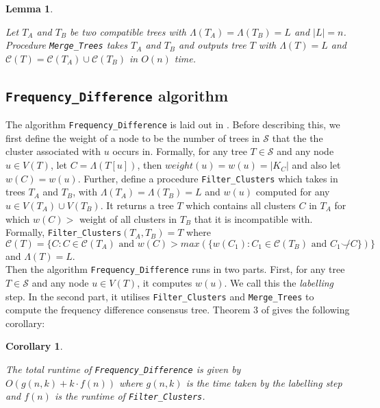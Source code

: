 \documentclass{article}
\newcommand{\compatible}{\smile}
\newcommand{\leafset}{\Lambda}
\newtheorem{mergetrees}[incompatibility]{Lemma}
\newtheorem{freqdiffruntimecomponents}[incompatibility]{Corollary}
\begin{document}
    \begin{mergetrees}
        \label{lem:mergetrees}

        Let $T_A$ and $T_B$ be two compatible trees with $\leafset(T_A) = \leafset(T_B) = L$ and $|L| = n$. Procedure \texttt{Merge\_Trees} takes $T_A$ and $T_B$ and outputs tree $T$ with $\leafset(T) = L$ and $\mathcal{C}(T) = \mathcal{C}(T_A) \cup \mathcal{C}(T_B)$ in $O(n)$ time.
    \end{mergetrees}

    \subsection{\texttt{Frequency\_Difference} algorithm}
    The algorithm \texttt{Frequency\_Difference} is laid out in \cite{jansson2018algorithms}. Before describing this, we first define the weight of a node to be the number of trees in $\mathcal{S}$ that the the cluster associated with $u$ occurs in. Formally, for any tree $T \in \mathcal{S}$ and any node $u \in V(T)$, let $C = \leafset(T[u])$, then $weight(u) = w(u) = |K_C|$ and also let $w(C) = w(u)$. Further, define a procedure \texttt{Filter\_Clusters} which takes in trees $T_A$ and $T_B$, with $\leafset(T_A) = \leafset(T_B) = L$ and $w(u)$ computed for any $u \in V(T_A) \cup V(T_B)$. It returns a tree $T$ which contains all clusters $C$ in $T_A$ for which $w(C) > $ weight of all clusters in $T_B$ that it is incompatible with. Formally, \texttt{Filter\_Clusters}$(T_A, T_B) = T$ where $\mathcal{C}(T) = \{C : C \in \mathcal{C}(T_A) \text{ and } w(C) > max(\{w(C_1) : C_1 \in \mathcal{C}(T_B) \text{ and } C_1 \not\compatible C\})\}$ and $\leafset(T) = L$.\\

    Then the algorithm \texttt{Frequency\_Difference} runs in two parts. First, for any tree $T \in \mathcal{S}$ and any node $u \in V(T)$, it computes $w(u)$. We call this the \textit{labelling} step. In the second part, it utilises \texttt{Filter\_Clusters} and \texttt{Merge\_Trees} to compute the frequency difference consensus tree. Theorem 3 of \cite{jansson2018algorithms} gives the following corollary:

    \begin{freqdiffruntimecomponents}
        \label{cor:freqdiffruntimecomponents}

        The total runtime of \texttt{Frequency\_Difference} is given by $O(g(n, k) + k \cdot f(n))$ where $g(n, k)$ is the time taken by the labelling step and $f(n)$ is the runtime of \texttt{Filter\_Clusters}.
    \end{freqdiffruntimecomponents}
\end{document}
